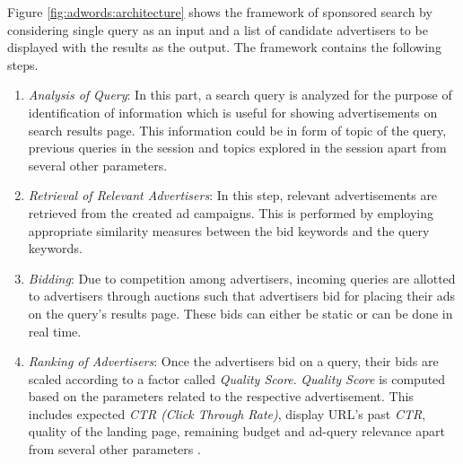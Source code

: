 Figure \ref{fig:adwords:architecture} shows the framework of sponsored search by considering single query as an input and a list of candidate advertisers to be displayed with the results as the output. The framework contains the following steps.


\begin{enumerate}[label=(\roman*).]
\item {\em Analysis of Query}: In this part, a search query is analyzed for the purpose of identification of information which is useful for showing advertisements on search results page. This information could be in form of topic of the query, previous queries in the session and topics explored in the session apart from several other parameters.
\item {\em Retrieval of Relevant Advertisers}: In this step, relevant advertisements are retrieved from the created ad campaigns. This is performed by employing  appropriate  similarity measures between  the bid keywords and the query keywords.
\item{\em Bidding}: Due to competition among advertisers, incoming queries are allotted to advertisers through auctions such that advertisers bid for placing their ads on the query's results page. These bids can either be static or can be done in real time.
\item{\em Ranking of Advertisers}: Once the advertisers bid on a query, their bids are scaled according to a factor called {\it Quality Score}. {\it Quality Score} is computed based on the parameters related to the respective advertisement. This includes expected {\it CTR (Click Through Rate)}, display URL's past {\it CTR}, quality of the landing page, remaining budget and ad-query relevance apart from several other parameters \cite{qualityScore}.
\end{enumerate}
